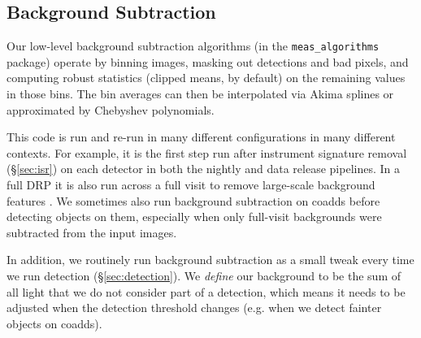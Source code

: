 \subsection{Background Subtraction}
\label{sec:backgrounds}

Our low-level background subtraction algorithms (in the \texttt{meas\_algorithms} package) operate by binning images, masking out detections and bad pixels, and computing robust statistics (clipped means, by default) on the remaining values in those bins.
The bin averages can then be interpolated via Akima splines or approximated by Chebyshev polynomials.

This code is run and re-run in many different configurations in many different contexts.
For example, it is the first step run after instrument signature removal (\S\ref{sec:isr}) on each detector in both the nightly and data release pipelines.
In a full DRP it is also run across a full visit to remove large-scale background features \citep{2019PASJ...71..114A}.
We sometimes also run background subtraction on coadds before detecting objects on them, especially when only full-visit backgrounds were subtracted from the input images.

In addition, we routinely run background subtraction as a small tweak every time we run detection (\S\ref{sec:detection}).
We \emph{define} our background to be the sum of all light that we do not consider part of a detection, which means it needs to be adjusted when the detection threshold changes (e.g. when we detect fainter objects on coadds).
